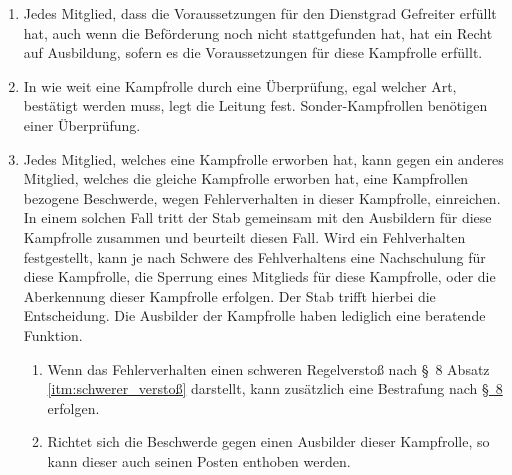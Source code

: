 \begin{enumerate}[label=(\arabic*)]
\begin{enumerate}[label=(\Alph*)]
        \item Ausbildungsleitfäden/Handbücher müssen durch die Leitung, oder ein anderes, von der Leitung damit beauftragtes Gremium geprüft und beschlossen werden.
        \item Die Leitung zeichnet sich für die Ausbildungsleitfäden/Handbücher verantwortlich.
    \end{enumerate}
    \item Jedes Mitglied, dass die Voraussetzungen für den Dienstgrad Gefreiter erfüllt hat, auch wenn die Beförderung noch nicht stattgefunden hat, hat ein Recht auf Ausbildung, sofern es die Voraussetzungen für diese Kampfrolle erfüllt.
    \item In wie weit eine Kampfrolle durch eine Überprüfung, egal welcher Art, bestätigt werden muss, legt die Leitung fest. Sonder-Kampfrollen benötigen einer Überprüfung.
    \item Jedes Mitglied, welches eine Kampfrolle erworben hat, kann gegen ein anderes Mitglied, welches die gleiche Kampfrolle erworben hat, eine Kampfrollen bezogene Beschwerde, wegen Fehlerverhalten in dieser Kampfrolle, einreichen. In einem solchen Fall tritt der Stab gemeinsam mit den Ausbildern für diese Kampfrolle zusammen und beurteilt diesen Fall. Wird ein Fehlverhalten festgestellt, kann je nach Schwere des Fehlverhaltens eine Nachschulung für diese Kampfrolle, die Sperrung eines Mitglieds für diese Kampfrolle, oder die Aberkennung dieser Kampfrolle erfolgen. Der Stab trifft hierbei die Entscheidung. Die Ausbilder der Kampfrolle haben lediglich eine beratende Funktion.
    \begin{enumerate}[label=(\Alph*)]
        \item Wenn das Fehlerverhalten einen schweren Regelverstoß nach \S~8 Absatz \ref{itm:schwerer_verstoß} darstellt, kann zusätzlich eine Bestrafung nach \hyperref[sec:umgang_mit_regelverstoeßen]{\S~8} erfolgen.
        \item Richtet sich die Beschwerde gegen einen Ausbilder dieser Kampfrolle, so kann dieser auch seinen Posten enthoben werden.
    \end{enumerate}
\end{enumerate}